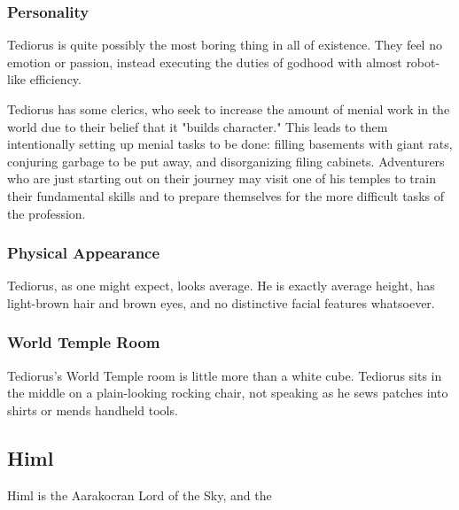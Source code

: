 \subsubsection*{Personality}
Tediorus is quite possibly the most boring thing in all of existence.
They feel no emotion or passion, instead executing the duties of godhood with almost robot-like efficiency.

Tediorus has some clerics, who seek to increase the amount of menial work in the world due to their belief that it "builds character."
This leads to them intentionally setting up menial tasks to be done: filling basements with giant rats, conjuring garbage to be put away, and disorganizing filing cabinets.
Adventurers who are just starting out on their journey may visit one of his temples to train their fundamental skills and to prepare themselves for the more difficult tasks of the profession.

\subsubsection*{Physical Appearance}
Tediorus, as one might expect, looks average.
He is exactly average height, has light-brown hair and brown eyes, and no distinctive facial features whatsoever.

\subsubsection*{World Temple Room}
Tediorus's World Temple room is little more than a white cube.
Tediorus sits in the middle on a plain-looking rocking chair, not speaking as he sews patches into shirts or mends handheld tools.

\subsection*{Himl}
\begin{goddesc}
\end{goddesc}



Himl is the Aarakocran Lord of the Sky, and the 